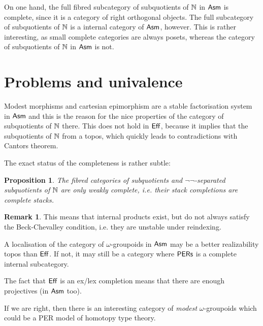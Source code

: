 \documentclass[12pt, a4paper]{article}
\theoremstyle{plain}
\newtheorem{prop}[theorem]{Proposition}
\theoremstyle{definition}
\newtheorem{remark}[theorem]{Remark}
\begin{document}
On one hand, the full fibred subcategory of subquotients of $\mathbb N$ in $\mathsf{Asm}$ is complete, since it is a category of right orthogonal objects. The full subcategory of subquotients of $\mathbb N$ is a internal category of $\mathsf{Asm}$, however. This is rather interesting, as small complete categories are always posets, whereas the category of subquotients of $\mathbb N$ in $\mathsf{Asm}$ is not.


\section{Problems and univalence}
Modest morphisms and cartesian epimorphism are a stable factorisation system in $\mathsf{Asm}$ and this is the reason for the nice properties of the category of subquotients of $\mathbb N$ there. This does not hold in $\mathsf{Eff}$, because it implies that the subquotients of $\mathbb N$ from a topos, which quickly leads to contradictions with Cantors theorem.

The exact status of the completeness is rather subtle:

\begin{prop} The fibred categories of subquotients and $\neg\neg$-separated subquotients of $\mathbb N$ are only weakly complete, i.e. their stack completions are complete stacks. \end{prop}

\begin{remark} This means that internal products exist, but do not always satisfy the Beck-Chevalley condition, i.e. they are unstable under reindexing. \end{remark}

A localisation of the category of $\omega$-groupoids in $\mathsf{Asm}$ may be a better realizability topos than $\mathsf{Eff}$. If not, it may still be a category where $\mathsf{PERs}$ is a complete internal subcategory.

The fact that $\mathsf{Eff}$ is an ex/lex completion means that there are enough projectives (in $\mathsf{Asm}$ too).

If we are right, then there is an interesting category of \emph{modest} $\omega$-groupoids which could be a PER model of homotopy type theory.

{}

\end{document}
